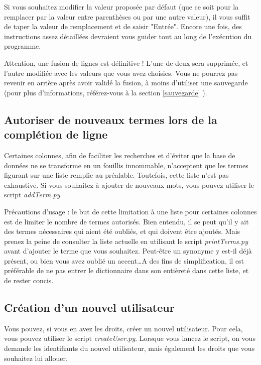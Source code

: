 \documentclass[12pt,a4paper]{article}
\begin{document}
        Si vous souhaitez modifier la valeur proposée par défaut (que ce soit pour la remplacer par la valeur
        entre parenthèses ou par une autre valeur), il vous suffit de taper la valeur de remplacement et de saisir
        "Entrée". Encore une fois, des instructions assez détaillées devraient vous guider
        tout au long de l'exécution du programme.

        Attention, une fusion de lignes est définitive ! L'une de deux sera supprimée, et l'autre modifiée avec les
        valeurs que vous avez choisies. Vous ne pourrez pas revenir en arrière après avoir validé la fusion,
        à moins d'utiliser une sauvegarde (pour plus d'informations, référez-vous à 
        la section \ref{sauvegarde} ).


    \bigskip


    \subsection{Autoriser de nouveaux termes lors de la complétion de ligne}\label{newterms}
        Certaines colonnes, afin de faciliter les recherches et d'éviter que la base
        de données ne se transforme en un fouillis innommable, n'acceptent que les termes
        figurant sur une liste remplie au préalable. Toutefois, cette liste n'est pas
        exhaustive. Si vous souhaitez à ajouter de nouveaux mots, vous pouvez utiliser
        le script \emph{addTerm.py}.

        Précautions d'usage : le but de cette limitation à une liste pour certaines colonnes
        est de limiter le nombre de termes autorisés. Bien entendu, il se peut qu'il y ait des
        termes nécessaires qui aient été oubliés, et qui doivent être ajoutés.
        Mais prenez la peine de consulter la liste actuelle en utilisant le script \emph{printTerms.py}
        avant d'ajouter le terme que vous souhaitez.
        Peut-être un synonyme y est-il déjà présent, ou bien vous avez
        oublié un accent\dots A des fins de simplification, il est préférable de ne pas entrer
        le dictionnaire dans son entièreté dans cette liste, et de rester concis.


    \subsection{Création d'un nouvel utilisateur}\label{nouvelutilisateur}
        Vous pouvez, si vous en avez les droits, créer un nouvel utilisateur.
        Pour cela, vous pouvez utiliser le script \emph{createUser.py}.
        Lorsque vous lancez le script, on vous demande les identifiants du nouvel
        utilisateur, mais également les droits que vous souhaitez lui allouer.
        
\end{document}

